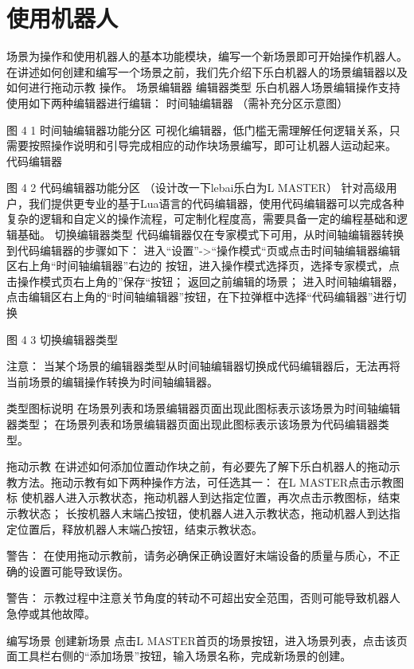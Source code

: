 \chapter{使用机器人}

场景为操作和使用机器人的基本功能模块，编写一个新场景即可开始操作机器人。在讲述如何创建和编写一个场景之前，我们先介绍下乐白机器人的场景编辑器以及如何进行拖动示教 操作。
场景编辑器
编辑器类型
乐白机器人场景编辑操作支持使用如下两种编辑器进行编辑：
时间轴编辑器
（需补充分区示意图）






图 4 1 时间轴编辑器功能分区
 可视化编辑器，低门槛无需理解任何逻辑关系，只需要按照操作说明和引导完成相应的动作块场景编写，即可让机器人运动起来。
代码编辑器


图 4 2  代码编辑器功能分区
（设计改一下lebai乐白为L MASTER）
针对高级用户，我们提供更专业的基于Lua语言的代码编辑器，使用代码编辑器可以完成各种复杂的逻辑和自定义的操作流程，可定制化程度高，需要具备一定的编程基础和逻辑基础。
切换编辑器类型
代码编辑器仅在专家模式下可用，从时间轴编辑器转换到代码编辑器的步骤如下：
	进入“设置”->“操作模式“页或点击时间轴编辑器编辑区右上角“时间轴编辑器”右边的 按钮，进入操作模式选择页，选择专家模式，点击操作模式页右上角的”保存“按钮；
	返回之前编辑的场景；
	进入时间轴编辑器，点击编辑区右上角的“时间轴编辑器”按钮，在下拉弹框中选择“代码编辑器”进行切换

图 4 3 切换编辑器类型

 	注意：
当某个场景的编辑器类型从时间轴编辑器切换成代码编辑器后，无法再将当前场景的编辑操作转换为时间轴编辑器。

类型图标说明
 在场景列表和场景编辑器页面出现此图标表示该场景为时间轴编辑器类型；
 在场景列表和场景编辑器页面出现此图标表示该场景为代码编辑器类型。

拖动示教
在讲述如何添加位置动作块之前，有必要先了解下乐白机器人的拖动示教方法。拖动示教有如下两种操作方法，可任选其一：
在L MASTER点击示教图标 使机器人进入示教状态，拖动机器人到达指定位置，再次点击示教图标，结束示教状态；
长按机器人末端凸按钮，使机器人进入示教状态，拖动机器人到达指定位置后，释放机器人末端凸按钮，结束示教状态。

 	警告：
在使用拖动示教前，请务必确保正确设置好末端设备的质量与质心，不正确的设置可能导致误伤。

 	警告：
示教过程中注意关节角度的转动不可超出安全范围，否则可能导致机器人急停或其他故障。

编写场景
创建新场景
点击L MASTER首页的场景按钮，进入场景列表，点击该页面工具栏右侧的“添加场景”按钮，输入场景名称，完成新场景的创建。

